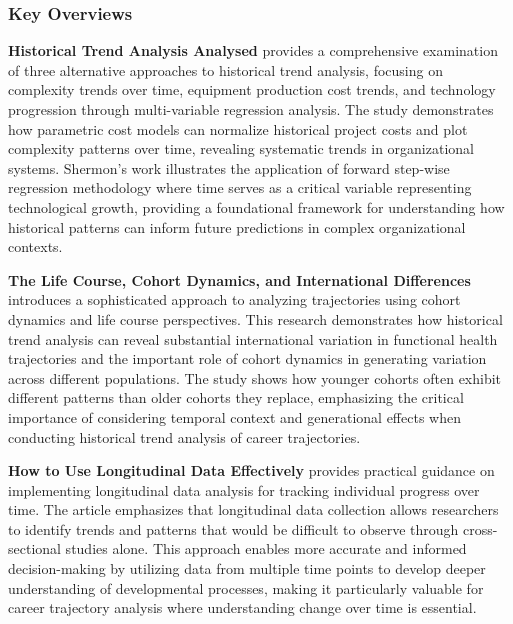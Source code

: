 \documentclass[../main.tex]{subfiles}
\begin{document}
\subsubsection{Key Overviews}


\textbf{Historical Trend Analysis Analysed} \parencite{shermon2011} provides a comprehensive examination of three alternative approaches to historical trend analysis, focusing on complexity trends over time, equipment production cost trends, and technology progression through multi-variable regression analysis. The study demonstrates how parametric cost models can normalize historical project costs and plot complexity patterns over time, revealing systematic trends in organizational systems. Shermon's work illustrates the application of forward step-wise regression methodology where time serves as a critical variable representing technological growth, providing a foundational framework for understanding how historical patterns can inform future predictions in complex organizational contexts.


\textbf{The Life Course, Cohort Dynamics, and International Differences} \parencite{haas2006} introduces a sophisticated approach to analyzing trajectories using cohort dynamics and life course perspectives. This research demonstrates how historical trend analysis can reveal substantial international variation in functional health trajectories and the important role of cohort dynamics in generating variation across different populations. The study shows how younger cohorts often exhibit different patterns than older cohorts they replace, emphasizing the critical importance of considering temporal context and generational effects when conducting historical trend analysis of career trajectories.


\textbf{How to Use Longitudinal Data Effectively} \parencite{shamrck2023} provides practical guidance on implementing longitudinal data analysis for tracking individual progress over time. The article emphasizes that longitudinal data collection allows researchers to identify trends and patterns that would be difficult to observe through cross-sectional studies alone. This approach enables more accurate and informed decision-making by utilizing data from multiple time points to develop deeper understanding of developmental processes, making it particularly valuable for career trajectory analysis where understanding change over time is essential.
\end{document}
